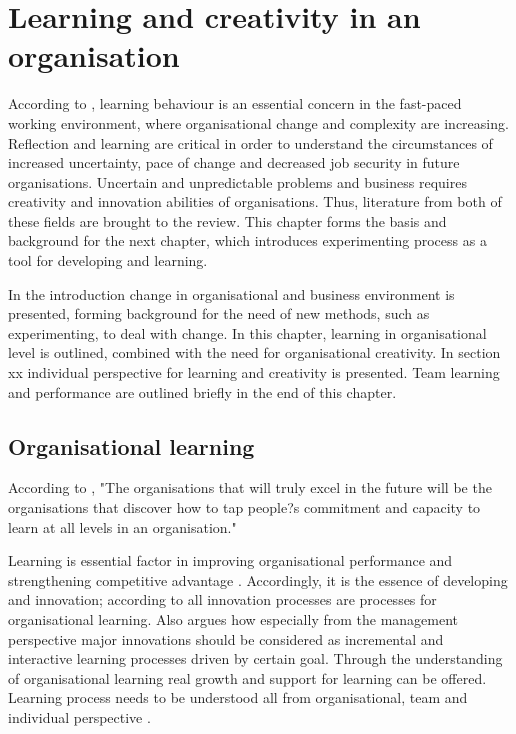\chapter{Learning and creativity in an organisation}
According to \citet{edmondson1999psychological}, learning behaviour is an essential concern in the fast-paced working environment, where organisational change and complexity are increasing. Reflection and learning are critical in order to understand the circumstances of increased uncertainty, pace of change and decreased job security in future organisations. Uncertain and unpredictable problems and business requires creativity and innovation abilities of organisations. Thus, literature from both of these fields are brought to the review. This chapter forms the basis and background for the next chapter, which introduces experimenting process as a tool for developing and learning. 

In the introduction change in organisational and business environment is presented, forming background for the need of new methods, such as experimenting, to deal with change. In this chapter, learning in organisational level is outlined, combined with the need for organisational creativity. In section xx individual perspective for learning and creativity is presented. Team learning and performance are outlined briefly in the end of this chapter. 

\section{Organisational learning}
According to \citet{senge1990fifth}, "The organisations that will truly excel in the future will be the organisations that discover how to tap people?s commitment and capacity to learn at all levels in an organisation."

Learning is essential factor in improving organisational performance and strengthening competitive advantage \citep{march1991exploration}. Accordingly, it is the essence of developing and innovation; according to \citet{buijs2007innovation} all innovation processes are processes for organisational learning. Also \citep{quinn1985managing} argues how especially from the management perspective major innovations should be considered as incremental and interactive learning processes driven by certain goal. Through the understanding of organisational learning real growth and support for learning can be offered. Learning process needs to be understood all from organisational, team and individual perspective \citep{buijs2007innovation}. 

